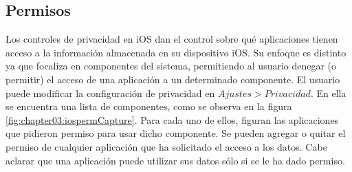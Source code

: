 \subsection{Permisos}
Los controles de privacidad en iOS dan el control sobre qué aplicaciones tienen acceso a la información almacenada en su dispositivo iOS. Su enfoque es distinto ya que focaliza en componentes del sistema, permitiendo al usuario denegar (o permitir) el acceso de una aplicación a un determinado componente. El usuario puede modificar la configuración de privacidad en $Ajustes > Privacidad$. En ella se encuentra una lista de componentes, como se observa en la figura \ref{fig:chapter03:iospermCapture}. Para cada uno de ellos, figuran las aplicaciones que pidieron permiso para usar dicho componente. Se pueden agregar o quitar el permiso de cualquier aplicación que ha solicitado el acceso a los datos. Cabe aclarar que una aplicación puede utilizar sus datos sólo si se le ha dado permiso.\\

